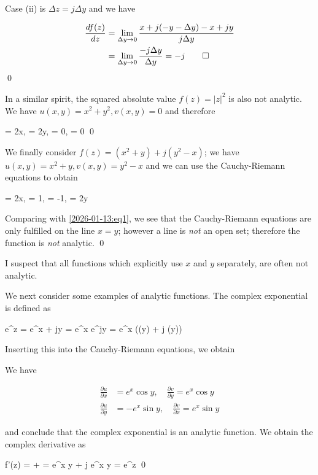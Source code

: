 Case (ii) is $\Delta z = j \Delta y$ and we have

\begin{align*}
\frac{df(z)}{dz} &= \lim_{\Delta y \rightarrow 0} \frac{ x + j(-y-\Delta y) -x + jy}{j \Delta y} \\
&= \lim_{\Delta y \rightarrow 0} \frac{- j\Delta y}{\Delta y} = -j \qed
\end{align*} \qed

In a similar spirit, the squared absolute value $f(z) = |z|^2$ is also not analytic. We have $u(x,y) = x^2 + y^2, v(x,y) = 0$ and therefore

\bee
     = 2x, \quad {} = 2y, \quad {} = 0, \quad {} = 0 \qed
\eee

We finally consider $f(z) = (x^2 + y) + j(y^2 - x)$; we have $u(x,y) = x^2 + y, v(x,y) = y^2 - x$ and we can use the Cauchy-Riemann equations to obtain

\bee
     = 2x, \quad {} = 1, \quad {} = -1, \quad {} = 2y
\eee

Comparing with \eqref{2026-01-13:eq1}, we see that the Cauchy-Riemann equations are only fulfilled on the line $x = y$; however a line is \emph{not} an open set; therefore the function is \emph{not} analytic. \qed

I suspect that all functions which explicitly use $x$ and $y$ separately, are often not analytic.

We next consider some examples of analytic functions. The complex exponential is defined as

\bee
e^{z} = e^{x + jy} = e^x e^{jy} = e^x (\cos(y) + j \sin(y))
\eee

Inserting this into the Cauchy-Riemann equations, we obtain

We have

\begin{align*}
    \frac{\partial u}{\partial x} &= e^x \cos y, \quad \frac{\partial v}{\partial y} = e^x \cos y \\
    \frac{\partial u}{\partial y} &= - e^x \sin y, \quad \frac{\partial v}{\partial x} = e^x \sin y
\end{align*}

and conclude that the complex exponential is an analytic function. We obtain the complex derivative as

\bee
f'(z) =  +  = e^x \cos y + j e^x \sin y = e^z \qed
\eee

